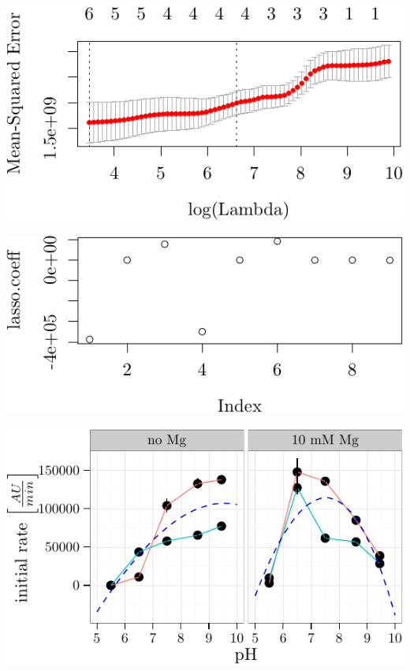 \documentclass[]{tufte-handout}
\begin{document}
\begin{marginfigure}
 \includegraphics{analysis_tufte_files/figure-latex/unnamed-chunk-11-1.pdf}
\end{marginfigure}\begin{marginfigure}
 \includegraphics{analysis_tufte_files/figure-latex/unnamed-chunk-11-2.pdf}
\end{marginfigure}\begin{marginfigure}
 \includegraphics{analysis_tufte_files/figure-latex/unnamed-chunk-11-3.pdf}
\end{marginfigure}
\end{document}
